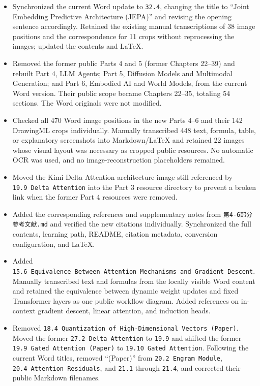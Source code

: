 \begin{itemize}
  Selected references from the user's candidates for the four topics directly covered in \texttt{34.2\ UMI\ Data}: MV-UMI (multiple views), ViTaMIn (visuotactile sensing), DexUMI (dexterous hands), and research on data scaling laws for robot imitation learning. Did not include candidates less directly related to the section's existing discussion.
\item
  Synchronized the current Word update to \texttt{32.4}, changing the title to ``Joint Embedding Predictive Architecture (JEPA)'' and revising the opening sentence accordingly. Retained the existing manual transcriptions of 38 image positions and the correspondence for 11 crops without reprocessing the images; updated the contents and LaTeX.
\item
  Removed the former public Parts 4 and 5 (former Chapters 22--39) and rebuilt Part 4, LLM Agents; Part 5, Diffusion Models and Multimodal Generation; and Part 6, Embodied AI and World Models, from the current Word version. Their public scope became Chapters 22--35, totaling 54 sections. The Word originals were not modified.
\item
  Checked all 470 Word image positions in the new Parts 4--6 and their 142 DrawingML crops individually. Manually transcribed 448 text, formula, table, or explanatory screenshots into Markdown/LaTeX and retained 22 images whose visual layout was necessary as cropped public resources. No automatic OCR was used, and no image-reconstruction placeholders remained.
\item
  Moved the Kimi Delta Attention architecture image still referenced by \texttt{19.9\ Delta\ Attention} into the Part 3 resource directory to prevent a broken link when the former Part 4 resources were removed.
\item
  Added the corresponding references and supplementary notes from \texttt{第4-6部分参考文献.md} and verified the new citations individually. Synchronized the full contents, learning path, README, citation metadata, conversion configuration, and LaTeX.
\item
  Added \texttt{15.6\ Equivalence\ Between\ Attention\ Mechanisms\ and\ Gradient\ Descent}. Manually transcribed text and formulas from the locally visible Word content and retained the equivalence between dynamic weight updates and fixed Transformer layers as one public workflow diagram. Added references on in-context gradient descent, linear attention, and induction heads.
\item
  Removed \texttt{18.4\ Quantization\ of\ High-Dimensional\ Vectors\ (Paper)}. Moved the former \texttt{27.2\ Delta\ Attention} to \texttt{19.9} and shifted the former \texttt{19.9\ Gated\ Attention\ (Paper)} to \texttt{19.10\ Gated\ Attention}. Following the current Word titles, removed ``(Paper)'' from \texttt{20.2\ Engram\ Module}, \texttt{20.4\ Attention\ Residuals}, and \texttt{21.1} through \texttt{21.4}, and corrected their public Markdown filenames.

\end{itemize}
